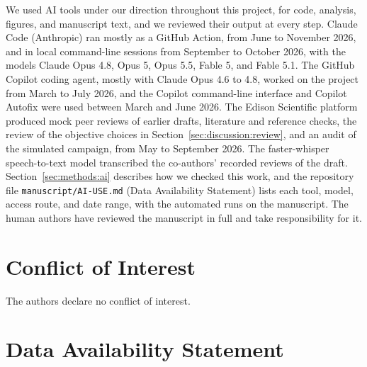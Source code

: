 \documentclass[11pt]{article}
\begin{document}
We used AI tools under our direction throughout this project, for code,
analysis, figures, and manuscript text, and we reviewed their output at
every step. Claude Code (Anthropic) ran mostly as a GitHub Action, from
June to November 2026, and in local command-line sessions from September
to October 2026, with the models Claude Opus 4.8, Opus 5, Opus 5.5,
Fable 5, and Fable 5.1. The GitHub Copilot coding agent, mostly with
Claude Opus 4.6 to 4.8, worked on the project from March to July 2026,
and the Copilot command-line interface and Copilot Autofix were used
between March and June 2026. The Edison Scientific platform produced mock
peer reviews of earlier drafts, literature and reference checks, the
review of the objective choices in Section~\ref{sec:discussion:review},
and an audit of the simulated campaign, from May to September 2026. The
faster-whisper speech-to-text model transcribed the co-authors' recorded
reviews of the draft. Section~\ref{sec:methods:ai} describes how we
checked this work, and the repository file \texttt{manuscript/AI-USE.md}
(Data Availability Statement) lists each tool, model, access route, and
date range, with the automated runs on the manuscript. The human authors
have reviewed the manuscript in full and take responsibility for it.

\section*{Conflict of Interest}
The authors declare no conflict of interest.

\section*{Data Availability Statement}
\end{document}
